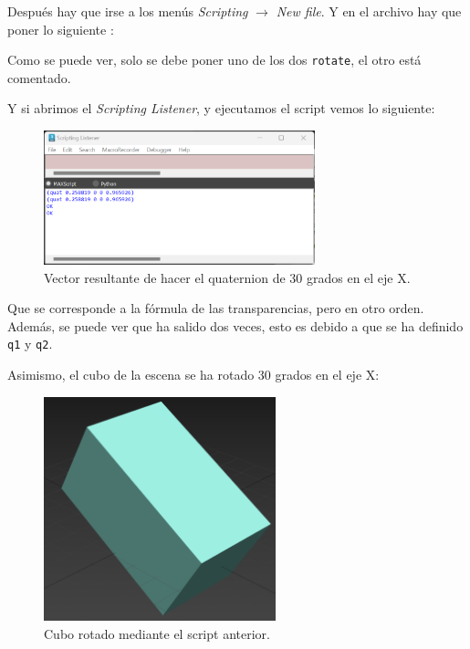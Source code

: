\documentclass{article}
\begin{document}
Después hay que irse a los menús \textit{Scripting} $\rightarrow$ \textit{New file}. Y en el archivo hay que poner lo siguiente \cite{explicacion}:



Como se puede ver, solo se debe poner uno de los dos \verb|rotate|, el otro está comentado.

\bigskip

Y si abrimos el \textit{Scripting Listener}, y ejecutamos el script vemos lo siguiente:

\begin{figure}[H]
    \centering
    \includegraphics[width=0.7\textwidth]{imagenes/7-2.png}
    \caption{Vector resultante de hacer el quaternion de 30 grados en el eje X.}
\end{figure}

Que se corresponde a la fórmula de las transparencias, pero en otro orden. Además, se puede ver que ha salido dos veces, esto es debido a que se ha definido \verb|q1| y \verb|q2|.

\bigskip

Asimismo, el cubo de la escena se ha rotado 30 grados en el eje X:

\begin{figure}[H]
    \centering
    \includegraphics[width=0.6\textwidth]{imagenes/7-3.png}
    \caption{Cubo rotado mediante el script anterior.}
\end{figure}

\newpage



\end{document}
